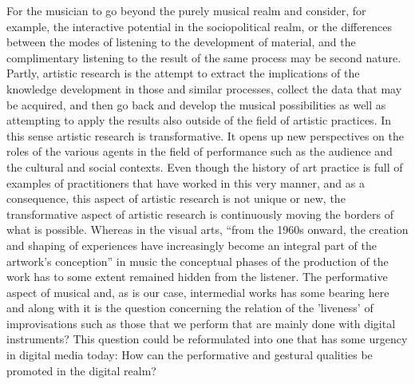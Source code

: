 \documentclass[11pt]{article}
\begin{document}
For the musician to go beyond the purely musical realm and consider,
for example, the interactive potential in the sociopolitical realm, or
the differences between the modes of listening to the development of
material, and the complimentary listening to the result of the same
process may be second nature. Partly, artistic research is the
attempt to extract the implications of the knowledge development in those
and similar processes, collect the data that may be acquired, and then
go back and develop the musical possibilities as well as attempting to
apply the results also outside of the field of artistic practices.
In this sense artistic
research is transformative. It opens up new perspectives on the roles
of the various agents in the field of performance such as the audience
and the cultural and social contexts. Even though the history of
art practice is full of examples of practitioners that have worked in
this very manner, and as a consequence, this aspect of artistic
research is not unique or new, the transformative aspect of artistic
research is continuously moving the borders of what is
possible. Whereas in the visual arts, ``from the 1960s onward, the
creation and shaping of experiences have increasingly become an
integral part of the artwork’s conception'' \citep{hantelmann2014} in
music the conceptual phases of the production of the work has to some
extent remained hidden from the listener. The performative aspect of musical and, as is our case, intermedial
works has some bearing here and along with it is the question
concerning the relation of the 'liveness' of
improvisations such as those that we perform that are mainly done with
digital instruments? This question could be
reformulated into one that has some urgency in digital media today:
How can the performative and gestural qualities be promoted in the
digital realm?

\end{document}
